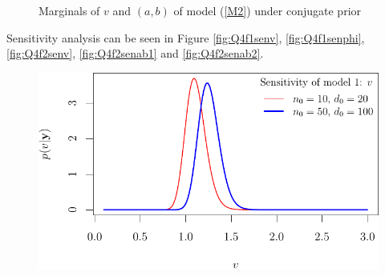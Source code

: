 \documentclass[12pt]{article}\usepackage[]{graphicx}\usepackage[]{color}
\newenvironment{knitrout}{}{} %
\begin{document}
\begin{enumerate}
\begin{enumerate}
\begin{knitrout}
\begin{figure}[h]
{\centering {}

}

\caption[Marginals of $v$ and $(a, b)$ of model (\ref{M2}) under conjugate prior]{Marginals of $v$ and $(a, b)$ of model (\ref{M2}) under conjugate prior}\label{fig:Q4f2e}
\end{figure}


\end{knitrout}
		
		Sensitivity analysis can be seen in Figure \ref{fig:Q4f1senv}, \ref{fig:Q4f1senphi}, \ref{fig:Q4f2senv}, \ref{fig:Q4f2senab1} and \ref{fig:Q4f2senab2}.
		
\begin{knitrout}
\color{fgcolor}\begin{figure}

{\centering \includegraphics[width=.7\linewidth]{figure/hw1_Q4f1senv-1} 

}
\end{figure}
\end{knitrout}
\end{enumerate}
\end{enumerate}
\end{document}
